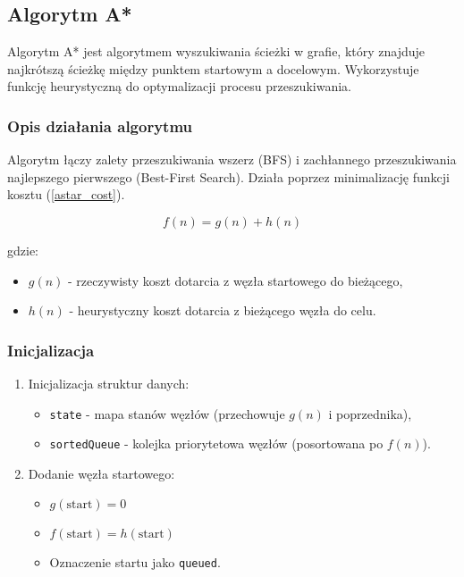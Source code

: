 \documentclass[../../../../doc.tex]{subfiles}
\begin{document}
\subsection{Algorytm A*}

Algorytm A* jest algorytmem wyszukiwania ścieżki w grafie, który znajduje najkrótszą ścieżkę między punktem startowym a docelowym. Wykorzystuje funkcję heurystyczną do optymalizacji procesu przeszukiwania.

\subsubsection{Opis działania algorytmu}

Algorytm łączy zalety przeszukiwania wszerz (BFS) i zachłannego przeszukiwania najlepszego pierwszego (Best-First Search).
Działa poprzez minimalizację funkcji kosztu (\cref{astar_cost}).


\begin{equation}
  f(n) = g(n) + h(n)
  \label{astar_cost}
\end{equation}

gdzie:
\begin{itemize}
  \item $g(n)$ - rzeczywisty koszt dotarcia z węzła startowego do bieżącego,
  \item $h(n)$ - heurystyczny koszt dotarcia z bieżącego węzła do celu.
\end{itemize}

\subsubsection{Inicjalizacja}
\begin{enumerate}
  \item Inicjalizacja struktur danych:
        \begin{itemize}
          \item \texttt{state} - mapa stanów węzłów (przechowuje $g(n)$ i poprzednika),
          \item \texttt{sortedQueue} - kolejka priorytetowa węzłów (posortowana po $f(n)$).
        \end{itemize}
  \item Dodanie węzła startowego:
        \begin{itemize}
          \item $g(\text{start}) = 0$
          \item $f(\text{start}) = h(\text{start})$
          \item Oznaczenie startu jako \texttt{queued}.
        \end{itemize}
\end{enumerate}
\end{document}
